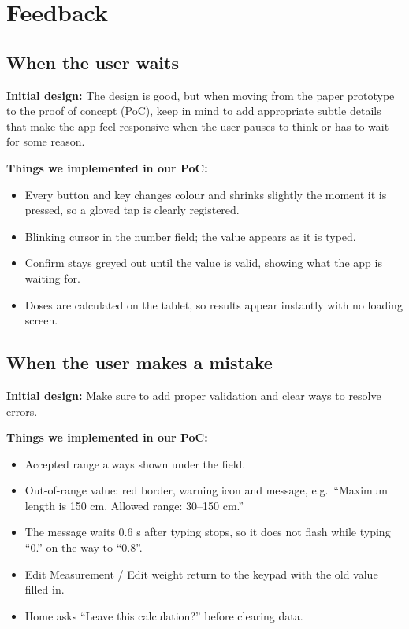 \documentclass[11pt,a4paper]{article}
\begin{document}
\section{Feedback}

\subsection{When the user waits}
\textbf{Initial design:} The design is good, but when moving from the paper prototype to the proof of concept (PoC), keep in mind to add appropriate subtle details that make the app feel responsive when the user pauses to think or has to wait for some reason.

\textbf{Things we implemented in our PoC:}
\begin{itemize}
  \item Every button and key changes colour and shrinks slightly the moment it is pressed, so a gloved tap is clearly registered.
  \item Blinking cursor in the number field; the value appears as it is typed.
  \item Confirm stays greyed out until the value is valid, showing what the app is waiting for.
  \item Doses are calculated on the tablet, so results appear instantly with no loading screen.
\end{itemize}

\subsection{When the user makes a mistake}
\textbf{Initial design:} Make sure to add proper validation and clear ways to resolve errors.

\textbf{Things we implemented in our PoC:}
\begin{itemize}
  \item Accepted range always shown under the field.
  \item Out-of-range value: red border, warning icon and message, e.g.\ ``Maximum length is 150 cm. Allowed range: 30--150 cm.''
  \item The message waits 0.6 s after typing stops, so it does not flash while typing ``0.'' on the way to ``0.8''.
  \item Edit Measurement / Edit weight return to the keypad with the old value filled in.
  \item Home asks ``Leave this calculation?'' before clearing data.
\end{itemize}
\end{document}
